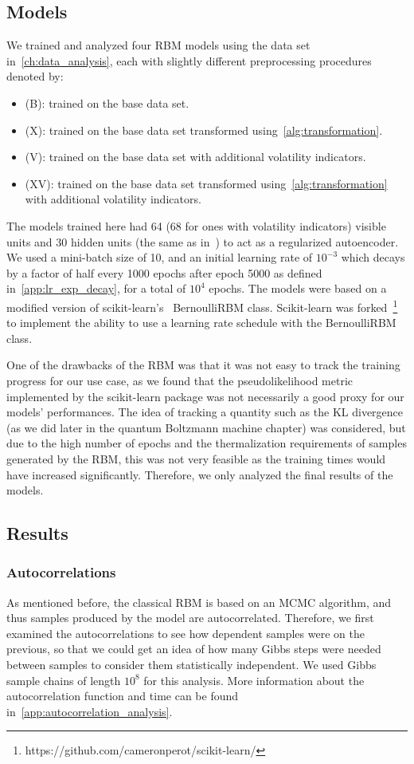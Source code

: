 \subsection{Models}
We trained and analyzed four RBM models using the data set in~\cref{ch:data_analysis}, each with slightly different preprocessing procedures denoted by:
\begin{itemize}
    \item (B): trained on the base data set.
    \item (X): trained on the base data set transformed using~\cref{alg:transformation}.
    \item (V): trained on the base data set with additional volatility indicators.
    \item (XV): trained on the base data set transformed using~\cref{alg:transformation} with additional volatility indicators.
\end{itemize}
The models trained here had 64 (68 for ones with volatility indicators) visible units and 30 hidden units (the same as in~\cite{kondratyev_2019}) to act as a regularized autoencoder.
We used a mini-batch size of 10, and an initial learning rate of \( 10^{-3} \) which decays by a factor of half every 1000 epochs after epoch 5000 as defined in~\cref{app:lr_exp_decay}, for a total of \( 10^4 \) epochs.
The models were based on a modified version of scikit-learn's~\cite{python_sklearn} BernoulliRBM class.
Scikit-learn was forked~\footnote{https://github.com/cameronperot/scikit-learn/} to implement the ability to use a learning rate schedule with the BernoulliRBM class.

One of the drawbacks of the RBM was that it was not easy to track the training progress for our use case, as we found that the pseudolikelihood metric implemented by the scikit-learn package was not necessarily a good proxy for our models' performances.
The idea of tracking a quantity such as the KL divergence (as we did later in the quantum Boltzmann machine chapter) was considered, but due to the high number of epochs and the thermalization requirements of samples generated by the RBM, this was not very feasible as the training times would have increased significantly.
Therefore, we only analyzed the final results of the models.

\subsection{Results}
\subsubsection{Autocorrelations}
As mentioned before, the classical RBM is based on an MCMC algorithm, and thus samples produced by the model are autocorrelated.
Therefore, we first examined the autocorrelations to see how dependent samples were on the previous, so that we could get an idea of how many Gibbs steps were needed between samples to consider them statistically independent.
We used Gibbs sample chains of length \( 10^8 \) for this analysis.
More information about the autocorrelation function and time can be found in~\cref{app:autocorrelation_analysis}.

